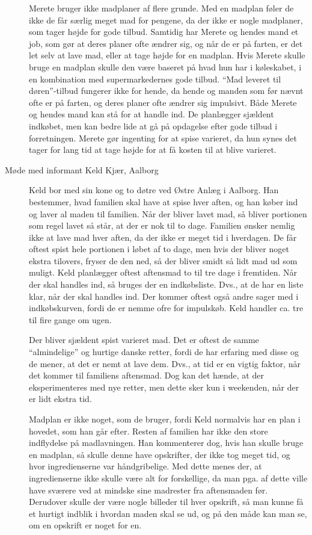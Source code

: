 \begin{description}
Merete bruger ikke madplaner af flere grunde. Med en madplan føler de ikke de får særlig meget mad for pengene, da der ikke er nogle madplaner, som tager højde for gode tilbud. Samtidig har Merete og hendes mand et job, som gør at deres planer ofte ændrer sig, og når de er på farten, er det let selv at lave mad, eller at tage højde for en madplan. Hvis Merete skulle bruge en madplan skulle den være baseret på hvad hun har i køleskabet, i en kombination med supermarkedernes gode tilbud. ``Mad leveret til døren''-tilbud fungerer ikke for hende, da hende og manden som før nævnt ofte er på farten, og deres planer ofte ændrer sig impulsivt. Både Merete og hendes mand kan stå for at handle ind. De planlægger sjældent indkøbet, men kan bedre lide at gå på opdagelse efter gode tilbud i forretningen. Merete gør ingenting for at spise varieret, da hun synes det tager for lang tid at tage højde for at få kosten til at blive varieret.

\item[Møde med informant Keld Kjær, Aalborg]

Keld bor med sin kone og to døtre ved Østre Anlæg i Aalborg. Han bestemmer, hvad familien skal have at spise hver aften, og han køber ind og laver al maden til familien. Når der bliver lavet mad, så bliver portionen som regel lavet så står, at der er nok til to dage. Familien ønsker nemlig ikke at lave mad hver aften, da der ikke er meget tid i hverdagen. De får oftest spist hele portionen i løbet af to dage, men hvis der bliver noget ekstra tilovers, fryser de den ned, så der bliver smidt så lidt mad ud som muligt. Keld planlægger oftest aftensmad to til tre dage i fremtiden. Når der skal handles ind, så bruges der en indkøbsliste. Dvs., at de har en liste klar, når der skal handles ind. Der kommer oftest også andre sager med i indkøbskurven, fordi de er nemme ofre for impulskøb. Keld handler ca. tre til fire gange om ugen.

Der bliver sjældent spist varieret mad. Det er oftest de samme ``almindelige'' og hurtige danske retter, fordi de har erfaring med disse og de mener, at det er nemt at lave dem. Dvs., at tid er en vigtig faktor, når det kommer til familiens aftensmad. Dog kan det hænde, at der eksperimenteres med nye retter, men dette sker kun i weekenden, når der er lidt ekstra tid.

Madplan er ikke noget, som de bruger, fordi Keld normalvis har en plan i hovedet, som han går efter. Resten af familien har ikke den store indflydelse på madlavningen. Han kommenterer dog, hvis han skulle bruge en madplan, så skulle denne have opskrifter, der ikke tog meget tid, og hvor ingredienserne var håndgribelige. Med dette menes der, at ingredienserne ikke skulle være alt for forskellige, da man pga. af dette ville have sværere ved at mindske sine madrester fra aftensmaden før. Derudover skulle der være nogle billeder til hver opskrift, så man kunne få et hurtigt indblik i hvordan maden skal se ud, og på den måde kan man se, om en opskrift er noget for en. 

\end{description}

